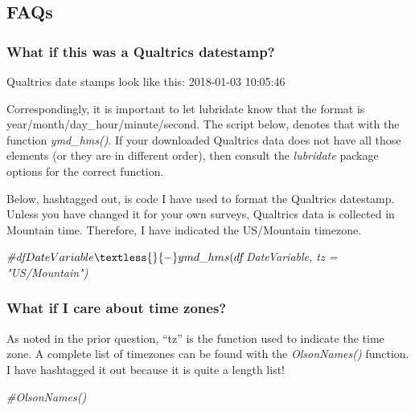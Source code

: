 \documentclass[
  english,
]{book}
\newenvironment{Shaded}{\begin{snugshade}}{\end{snugshade}}
\newcommand{\CommentTok}[1]{\textcolor[rgb]{0.56,0.35,0.01}{\textit{#1}}}
\begin{document}
\hypertarget{faqs}{%
\subsection{FAQs}\label{faqs}}

\hypertarget{what-if-this-was-a-qualtrics-datestamp}{%
\subsubsection{What if this was a Qualtrics datestamp?}\label{what-if-this-was-a-qualtrics-datestamp}}

Qualtrics date stamps look like this: 2018-01-03 10:05:46

Correspondingly, it is important to let lubridate know that the format is year/month/day\_hour/minute/second. The script below, denotes that with the function \emph{ymd\_hms()}. If your downloaded Qualtrics data does not have all those elements (or they are in different order), then consult the \emph{lubridate} package options for the correct function.

Below, hashtagged out, is code I have used to format the Qualtrics datestamp. Unless you have changed it for your own surveys, Qualtrics data is collected in Mountain time. Therefore, I have indicated the US/Mountain timezone.

\begin{Shaded}
\begin{Highlighting}[]
\CommentTok{\#df$DateVariable \textless{}{-} ymd\_hms(df$DateVariable, tz = "US/Mountain")}
\end{Highlighting}
\end{Shaded}

\hypertarget{what-if-i-care-about-time-zones}{%
\subsubsection{What if I care about time zones?}\label{what-if-i-care-about-time-zones}}

As noted in the prior question, ``tz'' is the function used to indicate the time zone. A complete list of timezones can be found with the \emph{OlsonNames()} function. I have hashtagged it out because it is quite a length list!

\begin{Shaded}
\begin{Highlighting}[]
\CommentTok{\#OlsonNames()}
\end{Highlighting}
\end{Shaded}
\end{document}
